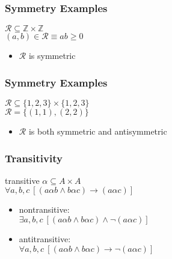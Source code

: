 \documentclass[dvipsnames]{beamer}
\begin{document}
\begin{frame}
  \frametitle{Symmetry Examples}

  \begin{example}
    $\mathcal{R} \subseteq \mathbb{Z} \times \mathbb{Z}$\\
    $(a,b) \in \mathcal{R} \equiv ab \geq 0$

    \medskip
    \begin{itemize}
      \item $\mathcal{R}$ is symmetric
    \end{itemize}
  \end{example}
\end{frame}

\begin{frame}
  \frametitle{Symmetry Examples}

  \begin{example}
    $\mathcal{R} \subseteq \{1,2,3\} \times \{1,2,3\}$\\
    $\mathcal{R} = \{(1,1), (2,2)\}$

    \begin{itemize}
      \item $\mathcal{R}$ is both symmetric and antisymmetric
    \end{itemize}
  \end{example}
\end{frame}

\begin{frame}
  \frametitle{Transitivity}

  \begin{block}{transitive}
    $\alpha \subseteq A \times A$\\
    $\forall a,b,c~[(a \alpha b \wedge b \alpha c) \rightarrow (a \alpha c)]$
  \end{block}

  \pause
  \begin{itemize}
    \item nontransitive:\\
      $\exists a,b,c~[(a \alpha b \wedge b \alpha c) \wedge \neg (a \alpha c)]$

    \pause
    \item antitransitive:\\
      $\forall a,b,c~[(a \alpha b \wedge b \alpha c) \rightarrow \neg (a \alpha c)]$
  \end{itemize}
\end{frame}
\end{document}
